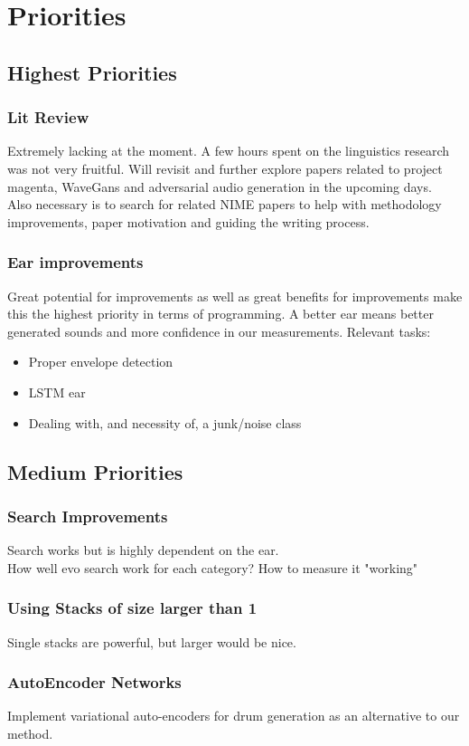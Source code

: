 \documentclass{article}
\begin{document}
\section{Priorities}
\subsection{Highest Priorities}
\subsubsection{Lit Review}
Extremely lacking at the moment. A few hours spent on the linguistics research was not very fruitful. Will revisit and further explore papers related to project magenta, WaveGans and adversarial audio generation in the upcoming days. \\
Also necessary is to search for related NIME papers to help with methodology improvements, paper motivation and guiding the writing process.  
\subsubsection{Ear improvements}
Great potential for improvements as well as great benefits for improvements make this the highest priority in terms of programming. A better ear means better generated sounds and more confidence in our measurements.
Relevant tasks:
\begin{itemize}
    \item Proper envelope detection
    \item LSTM ear
    \item Dealing with, and necessity of, a junk/noise class
\end{itemize}
\subsection{Medium Priorities}
\subsubsection{Search Improvements}
Search works but is highly dependent on the ear.\\ 
How well evo search work for each category? How to measure it "working"
\subsubsection{Using Stacks of size larger than 1}
Single stacks are powerful, but larger would be nice. 
\subsubsection{AutoEncoder Networks}
Implement variational auto-encoders for drum generation as an alternative to our method. 
\end{document}
